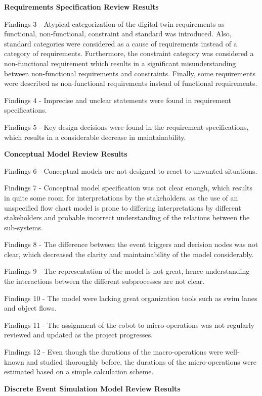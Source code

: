 \documentclass{llncs}
\begin{document}
    \textbf{Requirements Specification Review Results}

    Findings 3 - Atypical categorization of the digital twin requirements as functional, non-functional, constraint and standard was introduced. 
    Also, standard categories were considered as a cause of requirements instead of a category of requirements. Furthermore, 
    the constraint category was considered a non-functional requirement which results in a significant misunderstanding between non-functional 
    requirements and constraints. Finally, some requirements were described as non-functional requirements instead of functional requirements. 

    Findings 4 - Imprecise and unclear statements were found in requirement specifications. 

    Findings 5 - Key design decisions were found in the requirement specifications, which results in a considerable decrease in maintainability. 

    \textbf{Conceptual  Model Review Results}

    Findings 6 - Conceptual models are not designed to react to unwanted situations. 

    Findings 7 - Conceptual model specification was not clear enough, which results in quite some room for interpretations by the stakeholders. 
    as the use of an unspecified flow chart model is prone to differing interpretations by different stakeholders and probable incorrect understanding of the relations between the sub-systems.

    Findings 8 - The difference between the event triggers and decision nodes was not clear, which decreased the clarity and maintainability of the model considerably. 

    Findings 9 - The representation of the model is not great, hence understanding the interactions between the different subprocesses are not clear.

    Findings 10 - The model were lacking great organization tools such as swim lanes and object flows. 

    Findings 11 - The assignment of the cobot to micro-operations was not regularly reviewed and updated as the project progresses. 

    Findings 12 - Even though the durations of the macro-operations were well-known and studied thoroughly before, the durations of the micro-operations were estimated based on a simple calculation scheme.

    \textbf{Discrete Event Simulation Model Review Results}
\end{document}
